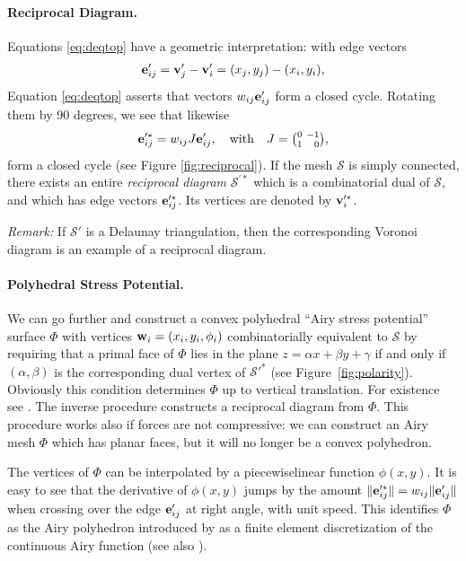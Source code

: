 \documentclass[review]{acmsiggraph}
\def\SS{{\mathcal S}}
\begin{document}
\paragraph{Reciprocal Diagram.}

Equations \eqref{eq:deqtop} have a geometric interpretation: with edge
vectors
	\begin{align*}
	{\mathbf e}'_{ij} = {\mathbf v}_j'-{\mathbf v}_i'=(x_j, y_j) - (x_i, y_i),
	\end{align*}
 Equation \eqref{eq:deqtop} asserts that vectors $w_{ij} {\mathbf e}_{ij}'$ form a
closed cycle. Rotating them by 90 degrees, we see that likewise
	\begin{align*}
	{\mathbf e}_{ij}^{\prime *} = w_{ij} J {\mathbf e}_{ij}', \quad \text{with}\quad
	J={\textstyle{0 \ -1 \choose 1 \ \hphantom{-}0}},
	\end{align*}
 form a closed cycle (see Figure \ref{fig:reciprocal}). If the mesh $\SS$
is simply connected, there exists an entire {\em reciprocal diagram}
$\SS^{\prime *}$ which is a combinatorial dual of $\SS$, and which has
edge vectors ${\mathbf e}_{ij}'^*$. Its vertices are denoted by ${\mathbf v}_i^{\prime
*}$.

{\it Remark:} If $\SS'$ is a Delaunay triangulation, then the
corresponding Voronoi diagram is an example of a reciprocal diagram.

\paragraph{Polyhedral Stress Potential.}

We can go further and construct a convex polyhedral ``Airy stress
potential'' surface $\Phi$ with vertices ${\mathbf w}_i=(x_i,y_i,\phi_i)$
combinatorially equivalent to $\SS$ by requiring that a primal face of
$\Phi$ lies in the plane $z=\alpha x + \beta y + \gamma$ if and only if
$(\alpha,\beta)$ is the corresponding dual vertex of $\SS'^*$ (see
Figure~\ref{fig:polarity}). Obviously this condition determines $\Phi$ up
to vertical translation. For existence see \cite{Ash1988}. The inverse
procedure constructs a reciprocal diagram from $\Phi$. This procedure
works also if forces are not compressive: we can construct an Airy mesh
$\Phi$ which has planar faces, but it will no longer be a convex
polyhedron.

The vertices of $\Phi$ can be interpolated by a piecewise\dash linear
function $\phi(x,y)$. It is easy to see that the derivative of $\phi(x,y)$
jumps by the amount $\|{\mathbf e}_{ij}'^*\| = w_{ij}\|{\mathbf e}_{ij}'\|$ when crossing
over the edge ${\mathbf e}'_{ij}$ at right angle, with unit speed. This identifies
$\Phi$ as the Airy polyhedron introduced by \cite{Fraternali2002a} as a
finite element discretization of the continuous Airy function (see also
\cite{Fraternali2010}).
\end{document}
